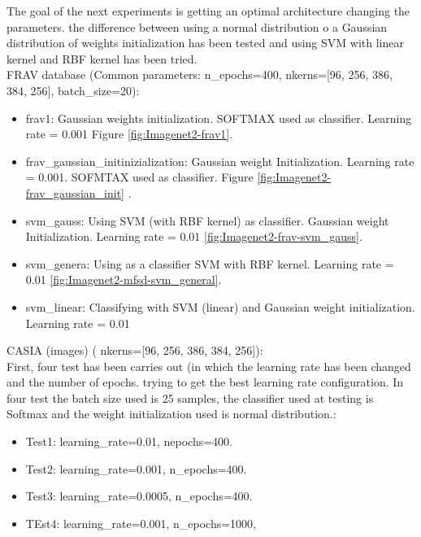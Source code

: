 The goal of the next experiments is getting an optimal architecture changing the parameters. the difference between using a normal distribution o a Gaussian distribution of weights initialization has been tested and using SVM with linear kernel and RBF kernel has been tried.\\

FRAV database (Common parameters:  n\_epochs=400, nkerns=[96, 256, 386, 384, 256], batch\_size=20):\\
\begin{itemize}
\item frav1: Gaussian weights initialization. SOFTMAX used as classifier. Learning rate = 0.001 Figure \ref{fig:Imagenet2-frav1}.
\item  frav\_gaussian\_initinizialization: Gaussian weight Initialization. Learning rate = 0.001. SOFMTAX used as classifier. Figure \ref{fig:Imagenet2-frav_gaussian_init} .
\item svm\_gauss: Using SVM (with RBF kernel) as classifier. Gaussian weight Initialization. Learning rate = 0.01 \ref{fig:Imagenet2-frav-svm_gauss}.
\item svm\_genera: Using as a classifier SVM with RBF kernel. Learning rate = 0.01 \ref{fig:Imagenet2-mfsd-svm_general}.
\item svm\_linear: Classifying with SVM (linear) and Gaussian weight initialization. Learning rate = 0.01\\
\end{itemize}

CASIA (images) ( nkerns=[96, 256, 386, 384, 256]):\\
First, four test has been carries out (in which the learning rate has been changed and the number of epochs. trying to get the best learning rate configuration. In four test the batch size used is 25 samples, the classifier used at testing is Softmax and the weight initialization used is normal distribution.:\\
\begin{itemize}
\item Test1: learning\_rate=0.01, nepochs=400.
\item Test2: learning\_rate=0.001, n\_epochs=400.
\item Test3: learning\_rate=0.0005, n\_epochs=400.
\item TEst4: learning\_rate=0.001, n\_epochs=1000,
\end{itemize}


